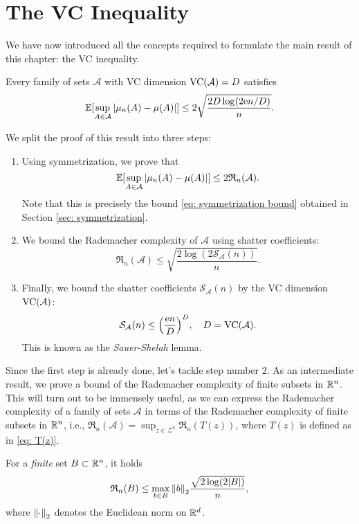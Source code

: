 \section{The VC Inequality}
\label{sec: VC inequality}

We have now introduced all the concepts required to formulate the main result of this chapter: the VC inequality.

\begin{theorem}[VC Inequality]
Every family of sets $\mathcal{A}$ with VC dimension $\operatorname{VC}(\mathcal{A}) = D$ satisfies
\[
    \operatorname{\mathbb{E}}[\sup_{A \in \mathcal{A}} \abs{\mu_n(A) - \mu(A)}] \leq 2 \sqrt{\frac{2D \log(2\mathrm{e} n / D)}{n}}.
\]
\end{theorem}

We split the proof of this result into three steps:

\begin{enumerate}
    \item Using symmetrization, we prove that
    \[
        \operatorname{\mathbb{E}}[\sup_{A \in \mathcal{A}} \abs{\mu_n(A) - \mu(A)}] \leq 2 \mathfrak{R}_n(\mathcal{A}).
    \]
    Note that this is precisely the bound \eqref{eq: symmetrization bound} obtained in Section \ref{sec: symmetrization}.

    \item We bound the Rademacher complexity of $\mathcal{A}$ using shatter coefficients:
    \[
        \mathfrak{R}_n(\mathcal{A}) \leq \sqrt{\frac{2 \log(2 \mathcal{S}_{\mathcal{A}}(n))}{n}}.
    \]

    \item Finally, we bound the shatter coefficients $\mathcal{S}_{\mathcal{A}}(n)$ by the VC dimension $\operatorname{VC}(\mathcal{A})$:
    \[
        \mathcal{S}_{\mathcal{A}}(n) \leq \left(\frac{\e n}{D}\right)^D, \quad D = \VC(\mathcal{A}).
    \]
    This is known as the \emph{Sauer-Shelah} lemma.
\end{enumerate}

Since the first step is already done, let's tackle step number 2. As an intermediate result, we prove a bound of the Rademacher complexity of finite subsets in $\mathbb{R}^n$. This will turn out to be immensely useful, as we can express the Rademacher complexity of a family of sets $\mathcal{A}$ in terms of the Rademacher complexity of finite subsets in $\mathbb{R}^n$, i.e., $\mathfrak{R}_n(\mathcal{A}) = \sup_{z \in \mathcal{Z}^n} \mathfrak{R}_n(T(z))$, where $T(z)$ is defined as in \eqref{eq: T(z)}.

\begin{lemma}
\label{lem: bound on rademacher complexity of finite set}
For a \emph{finite} set $B \subset \mathbb{R}^n$, it holds
\[
    \mathfrak{R}_n(B) \leq \max_{b \in B} \norm{b}_2 \frac{\sqrt{2 \log(2 \abs{B})}}{n},
\]
where $\norm{\cdot}_2$ denotes the Euclidean norm on $\mathbb{R}^d$.
\end{lemma}

